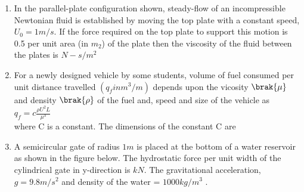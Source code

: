 \begin{enumerate}[start=1]
\item %
In the parallel-plate configuration shown, steady-flow of an incompressible Newtonian fluid is established by moving the top plate with a constant speed, $U_0=1m/s$. If the force required on the top plate to support this motion is 0.5 per unit area (in $m_2$) of the plate then the viscosity of the fluid between the plates is \underline{\hspace{2cm}} $N-s/m^2$ 
\begin{figure}[!ht]
\centering
{}%
\label{fig:my_label}
\end{figure}
\item %
For a newly designed vehicle by some students, volume of fuel consumed per unit distance travelled $(q_f in m^3/m)$ depends upon the vicosity $\brak{\mu}$ and density $\brak{\rho}$ of the fuel and, speed  and size  of the vehicle as \\
$q_f = c\frac{\rho U^2 L}{\mu ^3}$ \\
where C is a constant. The dimensions of the constant C are
\begin{enumerate}
\end{enumerate}
\item %
A semicircular gate of radius $1m$ is placed at the bottom of a water reservoir as shown in the figure below. The hydrostatic force per unit width of the cylindrical gate in y-direction is \underline{\hspace{2cm}} $kN$. The gravitational acceleration, $g=9.8m/s^2$ and density of the water = $1000kg/m^3$ . 

\end{enumerate}
